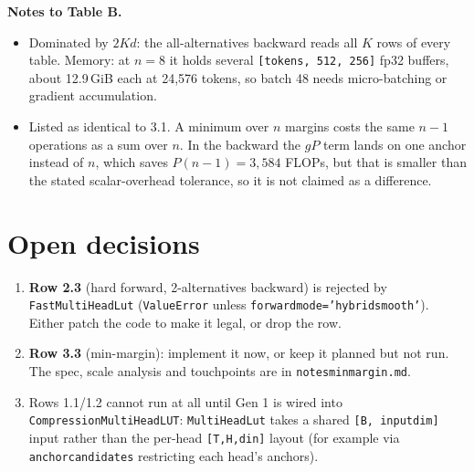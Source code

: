 \documentclass[10pt]{article}
\newcommand{\code}[1]{{\renewcommand{\_}{\textunderscore\allowbreak}\texttt{#1}}}
\newcommand{\note}[1]{\textsuperscript{\textbf{#1}}}
\begin{document}
\normalsize
\noindent\textbf{Notes to Table B.}
\begin{itemize}\setlength\itemsep{0pt}\footnotesize
\item[\note{f}] Dominated by $2Kd$: the all-alternatives backward reads all $K$ rows of every table. Memory: at $n=8$ it holds several
  \code{[tokens, 512, 256]} fp32 buffers, about 12.9\,GiB each at 24,576 tokens, so batch 48 needs micro-batching or gradient accumulation.
\item[\note{g}] Listed as identical to 3.1. A minimum over $n$ margins costs the same $n-1$ operations as a sum over $n$. In the backward the $gP$ term lands on one anchor instead
  of $n$, which saves $P(n-1)=3{,}584$ FLOPs, but that is smaller than the stated scalar-overhead tolerance, so it is not claimed as a difference.
\end{itemize}

\section*{Open decisions}
\begin{enumerate}\setlength\itemsep{1pt}
\item \textbf{Row 2.3} (hard forward, 2-alternatives backward) is rejected by \code{FastMultiHeadLut} (\code{ValueError} unless \code{forward\_mode='hybrid\_smooth'}).
  Either patch the code to make it legal, or drop the row.
\item \textbf{Row 3.3} (min-margin): implement it now, or keep it planned but not run. The spec, scale analysis and touchpoints are in \code{notes\_min\_margin.md}.
\item Rows 1.1/1.2 cannot run at all until Gen 1 is wired into \code{CompressionMultiHeadLUT}: \code{MultiHeadLut} takes a shared \code{[B, input\_dim]} input rather than
  the per-head \code{[T,H,d\_in]} layout (for example via \code{anchor\_candidates} restricting each head's anchors).
\end{enumerate}
\end{document}
